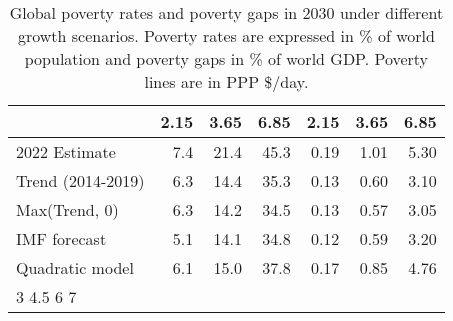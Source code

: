 \begin{table}[b]

\caption{\label{tab:tab:poverty}Global poverty rates and poverty gaps in 2030 under different growth scenarios. Poverty rates are expressed in \% of world population and poverty gaps in \% of world GDP. Poverty lines are in PPP \$/day.}
\centering
\begin{tabular}[t]{lrrrrrr}
\toprule
  & 2.15 & 3.65 & 6.85 & 2.15 & 3.65 & 6.85\\
\midrule
2022 Estimate & 7.4 & 21.4 & 45.3 & 0.19 & 1.01 & 5.30\\
Trend (2014-2019) & 6.3 & 14.4 & 35.3 & 0.13 & 0.60 & 3.10\\
Max(Trend, 0) & 6.3 & 14.2 & 34.5 & 0.13 & 0.57 & 3.05\\
IMF forecast & 5.1 & 14.1 & 34.8 & 0.12 & 0.59 & 3.20\\
Quadratic model & 6.1 & 15.0 & 37.8 & 0.17 & 0.85 & 4.76\\
\addlinespace
0%
3%
4.5%
6%
7%
\addlinespace
7%
\bottomrule
\end{tabular}
\end{table}